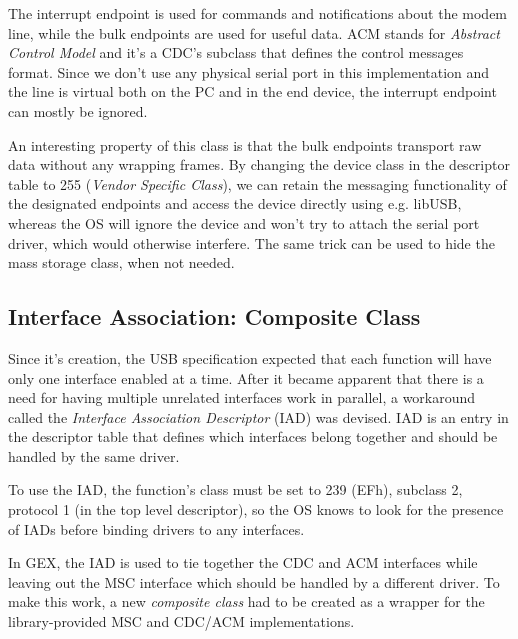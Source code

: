The interrupt endpoint is used for commands and notifications about the modem line, while the bulk endpoints are used for useful data. ACM stands for \textit{Abstract Control Model} and it's a CDC's subclass that defines the control messages format. Since we don't use any physical serial port in this implementation and the line is virtual both on the PC and in the end device, the interrupt endpoint can mostly be ignored.

An interesting property of this class is that the bulk endpoints transport raw data without any wrapping frames. By changing the device class in the descriptor table to 255 (\textit{Vendor Specific Class}), we can retain the messaging functionality of the designated endpoints and access the device directly using e.g. libUSB, whereas the OS will ignore the device and won't try to attach the serial port driver, which would otherwise interfere. The same trick can be used to hide the mass storage class, when not needed.

\subsection{Interface Association: Composite Class}

Since it's creation, the USB specification expected that each function will have only one interface enabled at a time. After it became apparent that there is a need for having multiple unrelated interfaces work in parallel, a workaround called the \textit{Interface Association Descriptor} (IAD) was devised. IAD is an entry in the descriptor table that defines which interfaces belong together and should be handled by the same driver.

To use the IAD, the function's class must be set to 239 (EFh), subclass 2, protocol 1 (in the top level descriptor), so the OS knows to look for the presence of IADs before binding drivers to any interfaces. 

In GEX, the IAD is used to tie together the CDC and ACM interfaces while leaving out the MSC interface which should be handled by a different driver. To make this work, a new \textit{composite class} had to be created as a wrapper for the library-provided MSC and CDC/ACM implementations.





